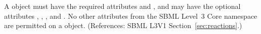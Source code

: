 A \SpeciesReference object must have the required attributes
 and , and may have the optional attributes
, , ,  and
.  No other attributes from the SBML Level~3 Core
namespace are permitted on a \SpeciesReference object.  (References: SBML
L3V1 Section~\ref{sec:reactions}.)
